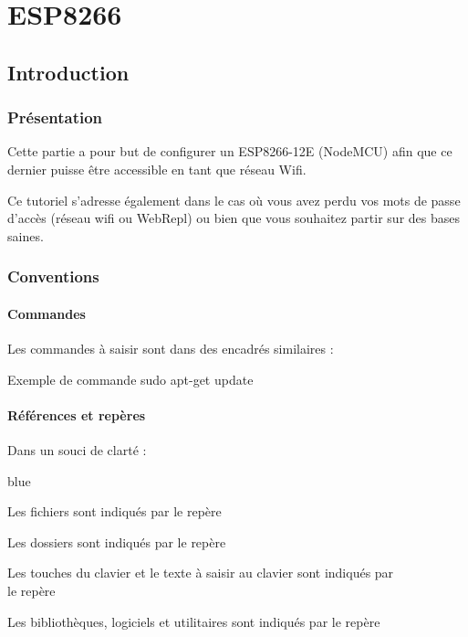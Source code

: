 \part{ESP8266}
\chapter{Introduction}     

\section{Présentation}

Cette partie a pour but de configurer un ESP8266-12E (NodeMCU) afin que ce dernier puisse être accessible en tant que réseau Wifi.

Ce tutoriel s'adresse également dans le cas où vous avez perdu vos mots de passe d'accès (réseau wifi ou WebRepl) ou bien que vous souhaitez partir sur des bases saines.\\


\section{Conventions}


\subsection{Commandes}

Les commandes à saisir sont dans des encadrés similaires : \\
\begin{Bash}{Exemple de commande}
sudo apt-get update
\end{Bash}

\subsection{Références et repères}

Dans un souci de clarté : 

\begin{items}{blue}{\Triangle}

	\item Les fichiers sont indiqués par le repère 
	\item Les dossiers sont indiqués par le repère 
	\item Les touches du clavier et le texte à saisir au clavier sont indiqués par \\le repère 
	\item Les bibliothèques, logiciels et utilitaires sont indiqués par le repère 

\end{items}


